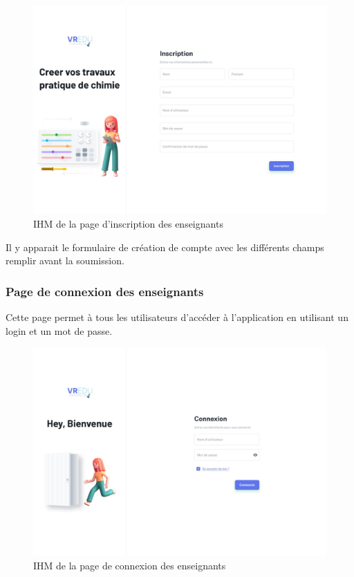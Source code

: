 \begin{figure}[H]
	\centering
	\includegraphics[width=1\textwidth]{img/insc}
	\caption{IHM de la page d'inscription des enseignants}
	\label{fig:mesh1}
\end{figure}

Il y apparait le formulaire de création de compte avec les différents champs remplir avant la soumission.

\subsubsection{Page de connexion des enseignants}

Cette page permet à tous les utilisateurs d’accéder à l’application en utilisant un login et
un mot de passe.

\begin{figure}[H]
	\centering
	\includegraphics[width=1\textwidth]{img/conn}
	\caption{IHM de la page de connexion des enseignants}
	\label{fig:mesh1}
\end{figure}

